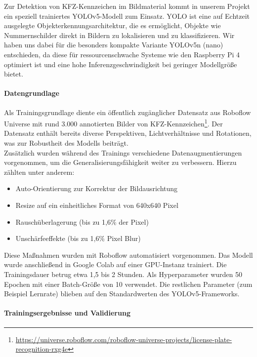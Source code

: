 Zur Detektion von KFZ-Kennzeichen im Bildmaterial kommt in unserem Projekt ein speziell trainiertes YOLOv5-Modell zum Einsatz. YOLO  ist eine auf Echtzeit ausgelegte Objekterkennungsarchitektur, die es ermöglicht, Objekte wie Nummernschilder direkt in Bildern zu lokalisieren und zu klassifizieren. Wir haben uns dabei für die besonders kompakte Variante YOLOv5n (nano) entschieden, da diese für ressourcenschwache Systeme wie den Raspberry Pi 4 optimiert ist und eine hohe Inferenzgeschwindigkeit bei geringer Modellgröße bietet.

\paragraph{Datengrundlage}

Als Trainingsgrundlage diente ein öffentlich zugänglicher Datensatz aus Roboflow Universe mit rund 3.000 annotierten Bilder von KFZ-Kennzeichen\footnote{\url{https://universe.roboflow.com/roboflow-universe-projects/license-plate-recognition-rxg4e}}. Der Datensatz enthält bereits diverse Perspektiven, Lichtverhältnisse und Rotationen, was zur Robustheit des Modells beiträgt.\\

Zusätzlich wurden während des Trainings verschiedene Datenaugmentierungen vorgenommen, um die Generalisierungsfähigkeit weiter zu verbessern. Hierzu zählten unter anderem:

\begin{itemize}
    \item Auto-Orientierung zur Korrektur der Bildausrichtung
    \item Resize auf ein einheitliches Format von 640x640 Pixel
    \item Rauschüberlagerung (bis zu 1{,}6\% der Pixel)
    \item Unschärfeeffekte (bis zu 1{,}6\% Pixel Blur)
  \end{itemize}

Diese Maßnahmen wurden mit Roboflow automatisiert vorgenommen. Das Modell wurde anschließend in Google Colab auf einer GPU-Instanz trainiert. Die Trainingsdauer betrug etwa 1,5 bis 2 Stunden. Als Hyperparameter wurden 50 Epochen mit einer Batch-Größe von 10 verwendet. Die restlichen Parameter (zum Beispiel Lernrate) blieben auf den Standardwerten des YOLOv5-Frameworks.

\paragraph{Trainingsergebnisse und Validierung}{}

